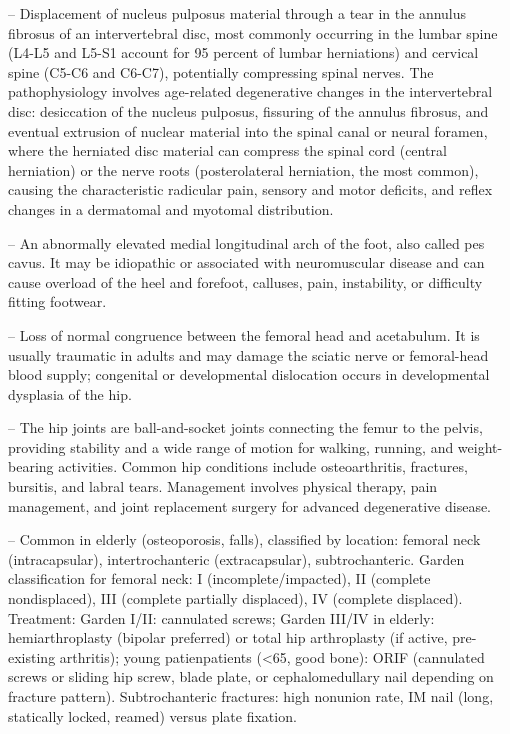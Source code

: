 -- Displacement of nucleus pulposus material through a tear in the annulus fibrosus of an intervertebral disc, most commonly occurring in the lumbar spine (L4-L5 and L5-S1 account for 95 percent of lumbar herniations) and cervical spine (C5-C6 and C6-C7), potentially compressing spinal nerves. The pathophysiology involves age-related degenerative changes in the intervertebral disc: desiccation of the nucleus pulposus, fissuring of the annulus fibrosus, and eventual extrusion of nuclear material into the spinal canal or neural foramen, where the herniated disc material can compress the spinal cord (central herniation) or the nerve roots (posterolateral herniation, the most common), causing the characteristic radicular pain, sensory and motor deficits, and reflex changes in a dermatomal and myotomal distribution.

-- An abnormally elevated medial longitudinal arch of the foot, also called pes cavus. It may be idiopathic or associated with neuromuscular disease and can cause overload of the heel and forefoot, calluses, pain, instability, or difficulty fitting footwear.

-- Loss of normal congruence between the femoral head and acetabulum. It is usually traumatic in adults and may damage the sciatic nerve or femoral-head blood supply; congenital or developmental dislocation occurs in developmental dysplasia of the hip.

-- The hip joints are ball-and-socket joints connecting the femur to the pelvis, providing stability and a wide range of motion for walking, running, and weight-bearing activities. Common hip conditions include osteoarthritis, fractures, bursitis, and labral tears. Management involves physical therapy, pain management, and joint replacement surgery for advanced degenerative disease.

-- Common in elderly (osteoporosis, falls), classified by location: femoral neck (intracapsular), intertrochanteric (extracapsular), subtrochanteric. Garden classification for femoral neck: I (incomplete/impacted), II (complete nondisplaced), III (complete partially displaced), IV (complete displaced). Treatment: Garden I/II: cannulated screws; Garden III/IV in elderly: hemiarthroplasty (bipolar preferred) or total hip arthroplasty (if active, pre-existing arthritis); young patienpatients (<65, good bone): ORIF (cannulated screws or sliding hip screw, blade plate, or cephalomedullary nail depending on fracture pattern). Subtrochanteric fractures: high nonunion rate, IM nail (long, statically locked, reamed) versus plate fixation.

